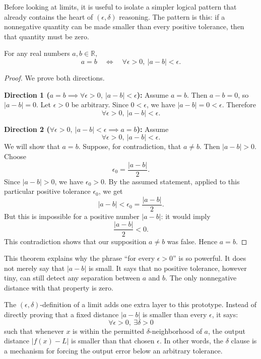 \documentclass{essay}
\begin{document}
Before looking at limits, it is useful to isolate a simpler logical pattern that already contains the heart of \((\epsilon,\delta)\) reasoning. The pattern is this: if a nonnegative quantity can be made smaller than every positive tolerance, then that quantity must be zero.

\begin{theorem}
  \label{thm:equality-by-arbitrary-precision}
  For any real numbers \(a,b \in \mathbb{R}\),
  \[ a=b \quad\Longleftrightarrow\quad \forall \epsilon>0,\ |a-b|<\epsilon. \]
\end{theorem}

\begin{proof}
  We prove both directions.

  \textbf{Direction 1 (\(a=b \implies \forall \epsilon>0,\ |a-b|<\epsilon\)):}
  Assume \(a=b\). Then \(a-b=0\), so \(|a-b|=0\). Let \(\epsilon>0\) be arbitrary. Since \(0<\epsilon\), we have \(|a-b|=0<\epsilon\). Therefore
  \[ \forall \epsilon>0,\ |a-b|<\epsilon. \]

  \textbf{Direction 2 (\(\forall \epsilon>0,\ |a-b|<\epsilon \implies a=b\)):}
  Assume
  \[ \forall \epsilon>0,\ |a-b|<\epsilon. \]
  We will show that \(a=b\). Suppose, for contradiction, that \(a\neq b\). Then \(|a-b|>0\). Choose
  \[ \epsilon_{0}=\frac{|a-b|}{2}. \]
  Since \(|a-b|>0\), we have \(\epsilon_{0}>0\). By the assumed statement, applied to this particular positive tolerance \(\epsilon_{0}\), we get
  \[ |a-b|<\epsilon_{0}=\frac{|a-b|}{2}. \]
  But this is impossible for a positive number \(|a-b|\): it would imply
  \[ \frac{|a-b|}{2}<0. \]
  This contradiction shows that our supposition \(a\neq b\) was false. Hence \(a=b\).
\end{proof}

This theorem explains why the phrase ``for every \(\epsilon>0\)'' is so powerful. It does not merely say that \(|a-b|\) is small. It says that no positive tolerance, however tiny, can still detect any separation between \(a\) and \(b\). The only nonnegative distance with that property is zero.

The \((\epsilon,\delta)\)-definition of a limit adds one extra layer to this prototype. Instead of directly proving that a fixed distance \(|a-b|\) is smaller than every \(\epsilon\), it says:
\[ \forall \epsilon>0,\ \exists \delta>0 \]
such that whenever \(x\) is within the permitted \(\delta\)-neighborhood of \(a\), the output distance \(|f(x)-L|\) is smaller than that chosen \(\epsilon\). In other words, the \(\delta\) clause is a mechanism for forcing the output error below an arbitrary tolerance.
\end{document}
